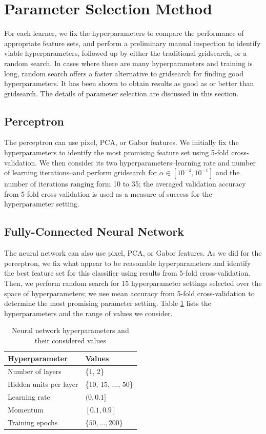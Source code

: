 \documentclass{acm_proc_article-sp}
\begin{document}
\section{Parameter Selection Method}%
For each learner, we fix the hyperparameters to compare the performance of appropriate feature sets, and perform a preliminary manual inspection to identify viable hyperparameters, followed up by either the traditional gridsearch, or a random search. In cases where there are many hyperparameters and training is long, random search offers a faster alternative to gridsearch for finding good hyperparameters. It has been shown to obtain results as good as or better than gridsearch\cite{Bergstra}. The details of parameter selection are discussed in this section.

\subsection{Perceptron}
The perceptron can use pixel, PCA, or Gabor features. We initially fix the hyperparameters to identify the most promising feature set using 5-fold cross-validation. We then consider its two hyperparameters--learning rate and number of learning iterations--and perform gridsearch for $\alpha \in [10^{-4},10^{-1}]$ and the number of iterations ranging form 10 to 35; the averaged validation accuracy from 5-fold cross-validation is used as a measure of success for the hyperparameter setting. 

\subsection{Fully-Connected Neural Network}
The neural network can also use pixel, PCA, or Gabor features. As we did for the perceptron, we fix what appear to be reasonable hyperparameters and identify the best feature set for this classifier using results from 5-fold cross-validation. Then, we perform random search for 15 hyperparameter settings selected over the space of hyperparameters; we use mean accuracy from 5-fold cross-validation to determine the most promising parameter setting. Table \ref{tab:nn-hyp} lists the hyperparameters and the range of values we consider.
\begin{table}[h!]
  \centering
  \begin{tabular}{|l|l|}
    \hline 
    {\bfseries Hyperparameter} & {\bfseries Values}\\
    \hline \hline
    Number of layers & \{1, 2\} \\
    Hidden units per layer & \{10, 15, ..., 50\} \\
    Learning rate & $(0, 0.1]$ \\
    Momentum & $[0.1, 0.9]$ \\
    Training epochs & $\{50, ..., 200\}$ \\
    \hline
  \end{tabular}
  \caption{Neural network hyperparameters and their considered values}
  \label{tab:nn-hyp}
\end{table}
\end{document}
